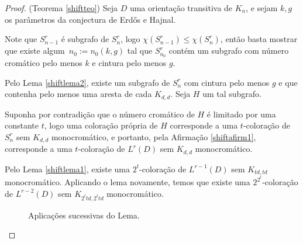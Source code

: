 \begin{proof}(Teorema \ref{shiftteo})
Seja $D$ uma orientação transitiva de $K_n$, e sejam $k,g$ os parâmetros da conjectura de Erd\H{o}s e Hajnal.

Note que $S_{n-1}^r$ é subgrafo de $S_n^r$, logo $\chi(S_{n-1}^r) \leq \chi(S_n^r)$, então basta mostrar que existe algum~$n_0 := n_0(k,g)$ tal que $S_{n_0}^r$ contém um subgrafo com número cromático pelo menos $k$ e cintura pelo menos $g$.

Pelo Lema \ref{shiftlema2}, existe um subgrafo de $S_n^r$ com cintura pelo menos $g$ e que contenha pelo menos uma aresta de cada $K_{d,d}$. Seja $H$ um tal subgrafo.

Suponha por contradição que o número cromático de $H$ é limitado por uma constante $t$, logo uma coloração própria de $H$ corresponde a uma $t$-coloração de $S_n^r$ sem $K_{d,d}$ monocromático, e portanto, pela Afirmação \ref{shiftafirm1}, corresponde a uma $t$-coloração de $L^r(D)$ sem $K_{d,d}$ monocromático.

Pelo Lema \ref{shiftlema1}, existe uma $2^t$-coloração de $L^{r-1}(D)$ sem $K_{td,td}$ monocromático. Aplicando o lema novamente, temos que existe uma $2^{2^t}$-coloração de $L^{r-2}(D)$ sem $K_{2^ttd,2^ttd}$ monocromático.

\begin{figure}[H]
\centering
{}
\caption{Aplicações sucessivas do Lema.}
\label{fig:shiftlemmaap}
\end{figure}


\end{proof}
